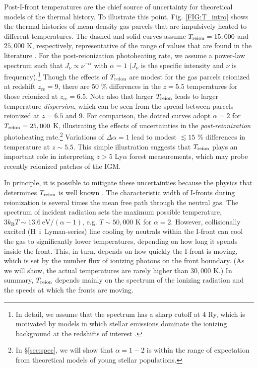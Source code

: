 \documentclass[twocolumn]{aastex62}
\newcommand{\zreion}{z_{\mathrm{re}}}
\newcommand{\HI}{H{\sc~i}}
\newcommand{\Treion}{T_{\rm reion}}
\begin{document}
Post-I-front temperatures are the chief source of uncertainty for theoretical models of the thermal history.   To illustrate this point, Fig. \ref{FIG:T_intro} shows the thermal histories of mean-density gas parcels that are impulsively heated to different temperatures.  The dashed and solid curves assume $\Treion = 15,000$ and $25,000$ K, respectively, representative of the range of values that are found in the literature \citep[e.g.][]{2012MNRAS.426.1349M, 2018arXiv180104931P, 2018arXiv180500099F}. For the post-reionization photoheating rate, we assume a power-law spectrum such that $J_{\nu} \propto \nu^{-\alpha}$ with $\alpha = 1$ ($J_{\nu}$ is the specific intensity and $\nu$ is frequency).\footnote{In detail, we assume that the spectrum has a sharp cutoff at 4 Ry, which is motivated by models in which stellar emissions dominate the ionizing background at the redshifts of interest \citep[e.g.][]{2009ApJ...703.1416F, 2012ApJ...746..125H, 2018arXiv180104931P}.}  Though the effects of $\Treion$ are modest for the gas parcels reionized at redshift $\zreion=9$, there are $50$ \% differences in the $z= 5.5$ temperatures for those reionized at $\zreion=6.5$.  Note also that larger $\Treion$ leads to larger temperature {\it dispersion}, which can be seen from the spread between parcels reionized at $z=6.5$ and 9.    For comparison, the dotted curves adopt $\alpha=2$ for $\Treion=25,000$ K, illustrating the effects of uncertainties in the {\it post-reionization} photoheating rate.\footnote{In \S \ref{sec:spec}, we will show that $\alpha=1-2$ is within the range of expectation from theoretical models of young stellar populations.}  Variations of $\Delta \alpha = 1$ lead to modest $\lesssim 15$ \% differences in temperature at $z\sim 5.5$.  This simple illustration suggests that $\Treion$ plays an important role in interpreting $z>5$ Ly$\alpha$ forest measurements, which may probe recently reionized patches of the IGM. 

In principle, it is possible to mitigate these uncertainties because the physics that determines $\Treion$ is well known \citep{1994MNRAS.266..343M}.  The characteristic width of I-fronts during reionization is several times the mean free path through the neutral gas.  The spectrum of incident radiation sets the maximum possible temperature, $3 k_{\mathrm{B}} T \sim 13.6~\mathrm{eV}/(\alpha -1)$, e.g. $T\sim 50,000$ K for $\alpha = 2$. However, collisionally excited (\HI\ Lyman-series) line cooling by neutrals within the I-front can cool the gas to significantly lower temperatures, depending on how long it spends inside the front.  This, in turn, depends on how quickly the I-front is moving, which is set by the number flux of ionizing photons on the front boundary.  (As we will show, the actual temperatures are rarely higher than $30,000$ K.)  In summary, $\Treion$ depends mainly on the spectrum of the ionizing radiation and the speeds at which the fronts are moving.  
\end{document}
